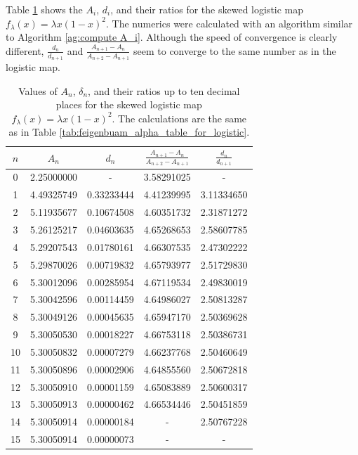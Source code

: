 Table \ref{tab:feigenbuam_constants_skewed_logistic_map} shows the $A_i$, $d_i$, and their ratios for the skewed logistic map $f_{\lambda} (x) = \lambda x (1-x)^2$.
The numerics were calculated with an algorithm similar to Algorithm \ref{ag:compute A_i}.
Although the speed of convergence is clearly different, 
$ \frac{d_n}{d_{n+1}} $ and $\frac{A_{n+1} - A_n}{A_{n+2} - A_{n+1}}$ seem to converge to the same number as in the logistic map.
\begin{table}
\centering
\begin{tabular}{|c|c|c|c|c|}
\hline
\( n \) & \( A_n \) & \( d_n \)  & \(\frac{A_{n+1} - A_n}{A_{n+2} - A_{n+1}}\)  &  \(\frac{d_n}{d_{n+1}}\) \\ \hline
0 & 2.25000000 & - & 3.58291025 & - \\
1 & 4.49325749 & 0.33233444 & 4.41239995 & 3.11334650\\
2 & 5.11935677 & 0.10674508 & 4.60351732 & 2.31871272 \\
3 & 5.26125217 & 0.04603635 & 4.65268653 & 2.58607785 \\
4 & 5.29207543 & 0.01780161 & 4.66307535 & 2.47302222 \\
5 & 5.29870026 & 0.00719832 & 4.65793977 & 2.51729830 \\
6 & 5.30012096 & 0.00285954 & 4.67119534 & 2.49830019 \\
7 & 5.30042596 & 0.00114459 & 4.64986027 & 2.50813287 \\
8 & 5.30049126 & 0.00045635 & 4.65947170 & 2.50369628 \\
9 & 5.30050530 & 0.00018227 & 4.66753118 & 2.50386731 \\
10 & 5.30050832 & 0.00007279 & 4.66237768 & 2.50460649 \\
11 & 5.30050896 & 0.00002906 & 4.64855560 & 2.50672818 \\
12 & 5.30050910 & 0.00001159 & 4.65083889 & 2.50600317 \\
13 & 5.30050913 & 0.00000462 & 4.66534446 & 2.50451859 \\
14 & 5.30050914 & 0.00000184 &  - & 2.50767228   \\
15 & 5.30050914 &  0.00000073&  - &  - \\
\hline
\end{tabular}
\caption{
	Values of \( A_n \), \( \delta_n \), and their ratios up to ten decimal places for the skewed logistic map $f_{\lambda}(x) = \lambda x(1-x)^2$.
	The calculations are the same as in Table \ref{tab:feigenbuam_alpha_table_for_logistic}.
}
\label{tab:feigenbuam_constants_skewed_logistic_map}
\end{table}